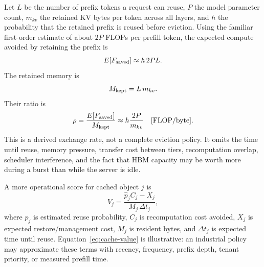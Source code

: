 

Let $L$ be the number of prefix tokens a request can reuse, $P$ the model parameter
count, $m_{kv}$ the retained KV bytes per token across all layers, and $h$ the
probability that the retained prefix is reused before eviction. Using the familiar
first-order estimate of about $2P$ FLOPs per prefill token, the expected compute
avoided by retaining the prefix is
\begin{equation}
E[F_{\rm saved}] \approx h\,2PL .
\end{equation}
The retained memory is
\begin{equation}
M_{\rm kept}=L\,m_{kv}.
\end{equation}
Their ratio is
\begin{equation}
\rho = \frac{E[F_{\rm saved}]}{M_{\rm kept}}
      \approx h\frac{2P}{m_{kv}}
      \quad [\mathrm{FLOP/byte}].
\label{eq:prefix-value}
\end{equation}
This is a derived exchange rate, not a complete eviction policy. It omits the time
until reuse, memory pressure, transfer cost between tiers, recomputation overlap,
scheduler interference, and the fact that HBM capacity may be worth more during a
burst than while the server is idle.

A more operational score for cached object $j$ is
\begin{equation}
V_j = \frac{\hat p_j C_j - X_j}{M_j\,\Delta t_j},
\label{eq:cache-value}
\end{equation}
where $\hat p_j$ is estimated reuse probability, $C_j$ is recomputation cost avoided,
$X_j$ is expected restore/management cost, $M_j$ is resident bytes, and $\Delta t_j$
is expected time until reuse. Equation~\ref{eq:cache-value} is illustrative: an
industrial policy may approximate these terms with recency, frequency, prefix depth,
tenant priority, or measured prefill time.

